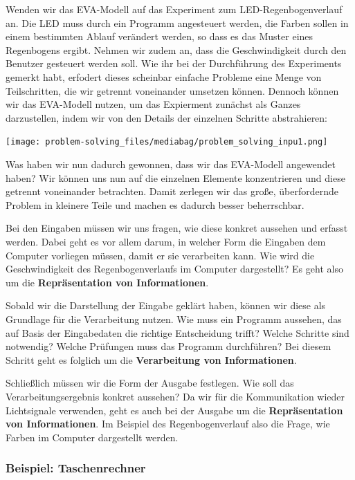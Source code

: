 \documentclass[
  ngerman,
  letterpaper,
  DIV=11]{scrreprt}
\begin{document}
Wenden wir das EVA-Modell auf das Experiment zum LED-Regenbogenverlauf
an. Die LED muss durch ein Programm angesteuert werden, die Farben
sollen in einem bestimmten Ablauf verändert werden, so dass es das
Muster eines Regenbogens ergibt. Nehmen wir zudem an, dass die
Geschwindigkeit durch den Benutzer gesteuert werden soll. Wie ihr bei
der Durchführung des Experiments gemerkt habt, erfodert dieses scheinbar
einfache Probleme eine Menge von Teilschritten, die wir getrennt
voneinander umsetzen können. Dennoch können wir das EVA-Modell nutzen,
um das Expierment zunächst als Ganzes darzustellen, indem wir von den
Details der einzelnen Schritte abstrahieren:

\begin{center}
\texttt{[image: problem-solving\_files/mediabag/problem\_solving\_inpu1.png]}
\end{center}

Was haben wir nun dadurch gewonnen, dass wir das EVA-Modell angewendet
haben? Wir können uns nun auf die einzelnen Elemente konzentrieren und
diese getrennt voneinander betrachten. Damit zerlegen wir das große,
überfordernde Problem in kleinere Teile und machen es dadurch besser
beherrschbar.

Bei den Eingaben müssen wir uns fragen, wie diese konkret aussehen und
erfasst werden. Dabei geht es vor allem darum, in welcher Form die
Eingaben dem Computer vorliegen müssen, damit er sie verarbeiten kann.
Wie wird die Geschwindigkeit des Regenbogenverlaufs im Computer
dargestellt? Es geht also um die \textbf{Repräsentation von
Informationen}.

Sobald wir die Darstellung der Eingabe geklärt haben, können wir diese
als Grundlage für die Verarbeitung nutzen. Wie muss ein Programm
aussehen, das auf Basis der Eingabedaten die richtige Entscheidung
trifft? Welche Schritte sind notwendig? Welche Prüfungen muss das
Programm durchführen? Bei diesem Schritt geht es folglich um die
\textbf{Verarbeitung von Informationen}.

Schließlich müssen wir die Form der Ausgabe festlegen. Wie soll das
Verarbeitungsergebnis konkret aussehen? Da wir für die Kommunikation
wieder Lichtsignale verwenden, geht es auch bei der Ausgabe um die
\textbf{Repräsentation von Informationen}. Im Beispiel des
Regenbogenverlauf also die Frage, wie Farben im Computer dargestellt
werden.

\subsubsection{Beispiel: Taschenrechner}\label{beispiel-taschenrechner}
\end{document}
